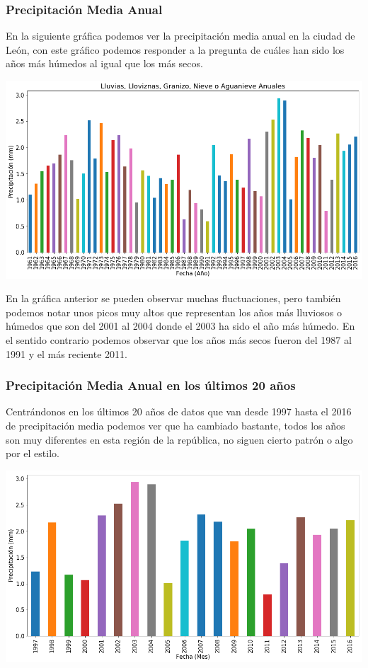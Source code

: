 \documentclass{article}
\begin{document}
\subsubsection{Precipitación Media Anual}
En la siguiente gráfica podemos ver la precipitación media anual en la ciudad de León, con este gráfico podemos responder a la pregunta de cuáles han sido los años más húmedos al igual que los más secos.
\begin{center}
    \includegraphics[scale = 0.47]{GLluvia.png}
\end{center}
En la gráfica anterior se pueden observar muchas fluctuaciones, pero también podemos notar unos picos muy altos que representan los años más lluviosos o húmedos que son del 2001 al 2004 donde el 2003 ha sido el año más húmedo. En el sentido contrario podemos observar que los años más secos fueron del 1987 al 1991 y el más reciente 2011.

\subsubsection{Precipitación Media Anual en los últimos 20 años}

Centrándonos en los últimos 20 años de datos que van desde 1997 hasta el 2016 de precipitación media podemos ver que ha cambiado bastante, todos los años son muy diferentes en esta región de la república, no siguen cierto patrón o algo por el estilo.

\begin{center}
    \includegraphics[scale = 0.46]{Last20Precip.png}
\end{center}
\end{document}
